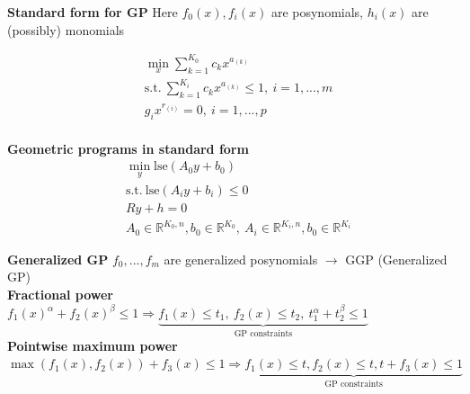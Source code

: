 \documentclass[a4paper]{article}
\begin{document}
\noindent
\textbf{Standard form for GP} Here $f_0(x), f_i(x)$ are posynomials, $h_i(x)$ are (possibly) monomials
\vspace{-0.3cm}
\begin{multicols}{2}
    \begin{align*}
        &\min_{x} {\sum_{k=1}^{K_0}{c_k{x^{a_{(k)}}}}}\\
        &\text{s.t.} \ \sum_{k=1}^{K_i}{c_k}x^{a_{(k)}} \le 1, \ i=1,...,m\\
        &g_i{x^{r_{(i)}}}=0, \ i=1,...,p
    \end{align*}
    \newcolumn\\
    \textbf{Geometric programs in standard form}
    \begin{align*}
        &\min_{y} \text{lse}(A_0y+b_0)\\
        &\text{s.t.} \ \text{lse}(A_i{y}+b_i)\le0\\
        &Ry+h=0\\
        &A_0\in\mathbb{R}^{K_0,n}, b_0 \in \mathbb{R}^{K_0}, \ A_i\in\mathbb{R}^{K_i,n}, b_0 \in \mathbb{R}^{K_i}
    \end{align*}
\end{multicols}
\noindent
\textbf{Generalized GP} $f_0, ..., f_m$ are generalized posynomials $\to$ GGP (Generalized GP)\\
{\small{\textbf{Fractional power}}} $f_1(x)^\alpha + f_2(x)^\beta\le1 \Rightarrow \underbrace{f_1(x)\le{t_1}, \ f_2(x)\le{t_2}, \ t_1^\alpha+t_2^\beta\le1}_{\text{GP constraints}}$  \\
{\small{\textbf{Pointwise maximum power}}} $\max(f_1(x), f_2(x))+f_3(x)\le1 \Rightarrow 
\underbrace{f_1(x)\le{t}, f_2(x)\le{t}, t+f_3(x)\le1}_{\text{GP constraints}}$ \\

\noindent
\end{document}

